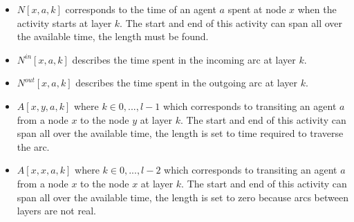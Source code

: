 \documentclass[12pt, a4paper, hidelinks]{article}
\numberwithin{equation}{section}
\begin{document}
\begin{itemize}
\item $N[x,a,k]$ corresponds to the time of an agent $a$ spent at node $x$ when the activity starts at layer $k$.
The start and end of this activity can span all over the available time, the length must be found.
\item $N^{in}[x,a,k]$ describes the time spent in the incoming arc at layer $k$.
\item $N^{out}[x,a,k]$ describes the time spent in the outgoing arc at layer $k$.
\item $A[x,y,a,k]$ where $k \in {0,...,l-1}$ which corresponds to transiting an agent $a$ from a node $x$ to the node $y$ at layer $k$.
The start and end of this activity can span all over the available time, the length is set to time required to traverse the arc.
\item $A[x,x,a,k]$ where $k \in {0,...,l-2}$ which corresponds to transiting an agent $a$ from a node $x$ to the node $x$ at layer $k$.
The start and end of this activity can span all over the available time, the length is set to zero because arcs between layers are not real.
\end{itemize}
\end{document}
